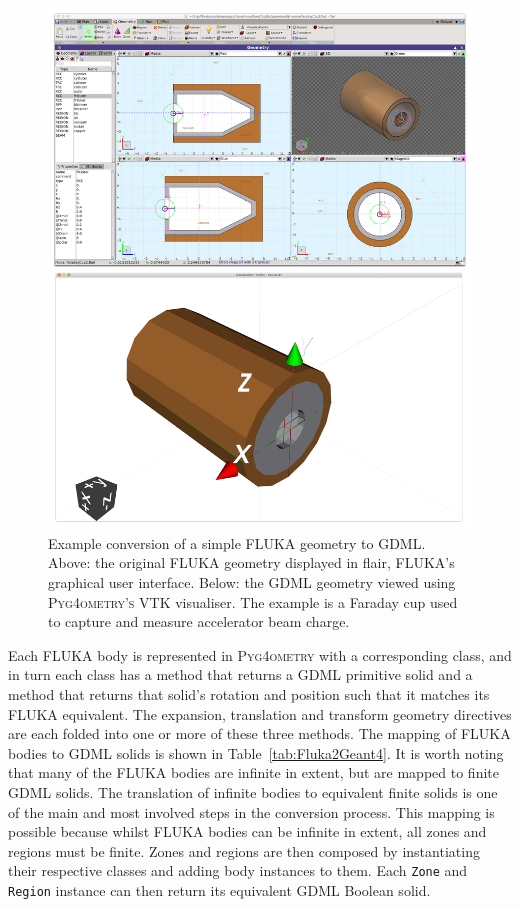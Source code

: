 \documentclass[final,5p,times,twocolumn]{elsarticle}
\newcommand{\pyinline}[1]{\lstinline[postbreak={}]{#1}}
\newcommand{\PYGEOMETRY}{\textsc{Pyg4ometry}}
\newcommand{\PYGEOMETRYPOS}{\textsc{Pyg4ometry's}} %
\begin{document}
\begin{figure}[htbp]
\begin{center}
\includegraphics[width=0.9\columnwidth]{./model-scene/faradayCup2.pdf}
\caption{Example conversion of a simple FLUKA geometry to GDML. Above:
  the original FLUKA geometry displayed in flair, FLUKA's graphical user interface.
  Below: the GDML geometry viewed using \PYGEOMETRYPOS{} VTK visualiser. The example is a Faraday cup used to capture
and measure accelerator beam charge.}
\label{fig:fluka-to-geant4-cup}
\end{center}
\end{figure}

Each FLUKA body is represented in \PYGEOMETRY{} with a corresponding class,
and in turn each class has a method that returns a GDML primitive solid and
a method that returns that solid's rotation and position such that it
matches its FLUKA equivalent.  The expansion, translation and transform
geometry directives are each folded into one or more of these three
methods.  The mapping of FLUKA bodies to GDML solids is shown in
Table~\ref{tab:Fluka2Geant4}.  It is worth noting that many of the FLUKA
bodies are infinite in extent, but are mapped to finite GDML solids.  The
translation of infinite bodies to equivalent finite solids is one of the
main and most involved steps in the conversion process.  This mapping is
possible because whilst FLUKA bodies can be infinite in extent, all zones
and regions must be finite.  Zones and regions are then composed by
instantiating their respective classes and adding body instances to them.  Each
\pyinline{Zone} and \pyinline{Region} instance can then return its
equivalent GDML Boolean solid.
\end{document}
